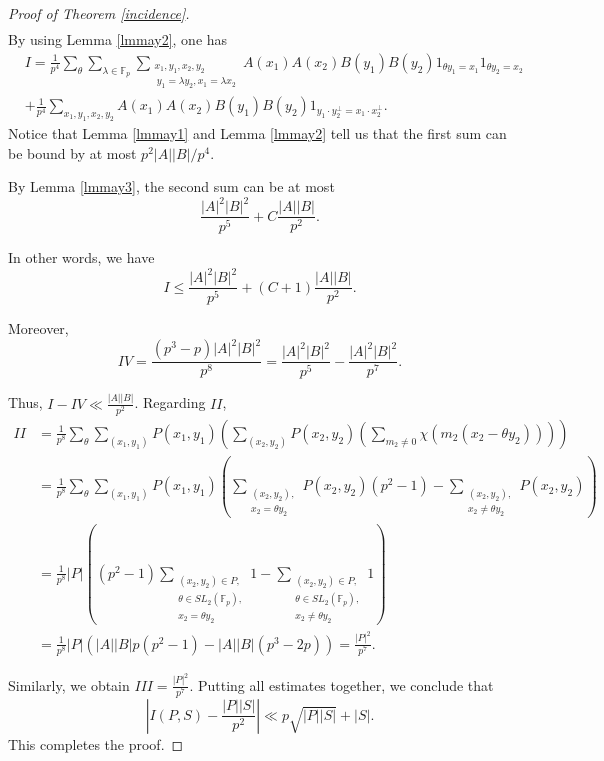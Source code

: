 \documentclass[11pt]{article}
\def\Fbb{\mathbb{F}}
\def\SL{SL}
\def\l({\left(}
\def\r){\right)}
\def\lv{\left\vert}
\def\rv{\right\vert}
\begin{document}
\begin{proof}[Proof of Theorem \ref{incidence}]
\begin{align*}
\end{align*}
By using  Lemma \ref{lmmay2}, one has
\begin{align*}
    &I=\frac{1}{p^4}\sum_{\theta}\sum_{\lambda\in \mathbb{F}_p}\sum_{\substack{x_1, y_1, x_2, y_2\\~y_1=\lambda y_2, x_1=\lambda x_2}}A(x_1)A(x_2)B(y_1)B(y_2)1_{\theta y_1=x_1}1_{\theta y_2=x_2}\\
    &+\frac{1}{p^4}\sum_{x_1, y_1, x_2, y_2}A(x_1)A(x_2)B(y_1)B(y_2)1_{y_1\cdot y_2^\perp=x_1\cdot x_2^\perp}.
\end{align*}
Notice that Lemma \ref{lmmay1} and Lemma \ref{lmmay2} tell us that the first sum can be bound by at most $p^2|A||B|/p^4$.

By Lemma \ref{lmmay3}, the second sum can be at most 
\[\frac{|A|^2|B|^2}{p^5}+C\frac{|A||B|}{p^2}.\]

In other words, we have 
\[I\le \frac{|A|^2|B|^2}{p^5}+(C+1)\frac{|A||B|}{p^2}.\]

Moreover,
\[IV=\frac{(p^3-p)|A|^2|B|^2}{p^8}=\frac{|A|^2|B|^2}{p^5}-\frac{|A|^2|B|^2}{p^7}.\]

Thus, $I-IV\ll \frac{|A||B|}{p^2}$.
Regarding $II$, 
\begin{align*}
    II & =\frac{1}{p^8}\sum_\theta \sum_{( x_1,y_1)} P(x_1,y_1) \l( \sum_{(x_2,y_2)} P(x_2,y_2) \l( \sum_{m_2\ne 0} \chi \l( m_2 \l( x_2 -\theta y_2 \r) \r) \r) \r) \\
    & = \frac{1}{p^8} \sum_\theta \sum_{(x_1,y_1)} P(x_1 ,y_1) \l( \sum_{\substack{(x_2,y_2), \\ x_2 =\theta y_2}} P(x_2,y_2) \l( p^2-1 \r)  - \sum_{ \substack{(x_2,y_2), \\ x_2 \ne \theta y_2 }} P(x_2,y_2)  \r) \\
    & = \frac{1}{p^8} \lv P\rv \l( \l( p^2-1\r)\sum_{\substack{(x_2,y_2) \in P,\\ \theta \in \SL_2 \l( \Fbb_p \r) ,\\ x_2 =\theta y_2}} 1  - \sum_{ \substack{(x_2,y_2) \in P,\\ \theta \in \SL_2 \l( \Fbb_p \r) ,\\ x_2 \ne \theta y_2 }} 1\r) \\
    & = \frac{1}{p^8} \lv P\rv \l( \lv A\rv \lv B\rv p\l( p^2 -1\r) - \lv A\rv \lv B\rv \l( p^3 -2p \r) \r) = \frac{\lv P\rv^2}{p^7}.
\end{align*}

Similarly, we obtain  $III =\frac{\lv P\rv^2}{p^7} .$
Putting all estimates together, we conclude that 
\[\left\vert I(P, S)-\frac{|P||S|}{p^2}\right\vert\ll p\sqrt{|P||S|}+|S|.\]
This completes the proof.
\end{proof}
\end{document}
